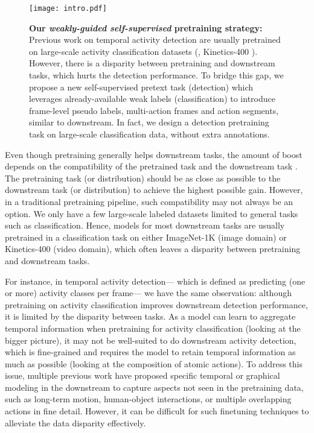 \documentclass[letterpaper]{article} \usepackage{aaai23}  \usepackage{times}  \usepackage{helvet}  \usepackage{courier}  \usepackage[hyphens]{url}  \usepackage{graphicx} \urlstyle{rm} \def\UrlFont{\rm}  \usepackage{natbib}  \usepackage{caption} \frenchspacing  \setlength{\pdfpagewidth}{8.5in}  \setlength{\pdfpageheight}{11in}  \usepackage{algorithm}
\newcommand{\ch}{}
\begin{document}
\begin{figure}[t]
	\centering
	\texttt{[image: intro.pdf]}
	\caption{\textbf{Our \ch{\textit{weakly-guided self-supervised}} pretraining strategy:} Previous work on temporal activity detection are usually pretrained on large-scale activity classification datasets (, Kinetics-400 \cite{carreira2017quo}). However, there is a disparity between pretraining and downstream tasks, which hurts the detection performance. \ch{To bridge this gap, we propose a new self-supervised pretext task (detection) which leverages already-available weak labels (classification) to introduce frame-level pseudo labels, multi-action frames and action segments, similar to downstream. In fact, we design a detection pretraining task on large-scale classification data, without extra annotations.} }
	\label{fig:intro}
\end{figure}

Even though pretraining generally helps downstream tasks, the amount of boost depends on the compatibility of the pretrained task and the downstream task \cite{abnar2021exploring}. The pretraining task (or distribution) should be as close as possible to the downstream task (or distribution) to achieve the highest possible gain. However, in a traditional pretraining pipeline, such compatibility may not always be an option. We only have a few large-scale labeled datasets limited to general tasks such as classification. Hence, models for most downstream tasks are usually pretrained in a classification task on either ImageNet-1K \cite{deng2009imagenet} (image domain) or Kinetics-400 \cite{carreira2017quo} (video domain), which often leaves a disparity between pretraining and downstream tasks. 


For instance, in temporal activity detection--- which is defined as predicting (one or more) activity classes per frame--- we have the same observation: although pretraining on activity classification improves downstream detection performance, it is limited by the disparity between tasks. As a model can learn to aggregate temporal information when pretraining for activity classification (looking at the bigger picture), it may not be well-suited to do downstream activity detection, which is fine-grained and requires the model to retain temporal information as much as possible (looking at the composition of atomic actions). 
To address this issue, multiple previous work have proposed specific temporal \cite{piergiovanni2018learning, piergiovanni2019temporal, kahatapitiya2021coarse} or graphical \cite{ghosh2020stacked, mavroudi2020representation} modeling in the downstream to capture aspects not seen in the pretraining data, such as long-term motion, human-object interactions, or multiple overlapping actions in fine detail. However, it can be difficult for such finetuning techniques to alleviate the data disparity effectively. 
\end{document}
